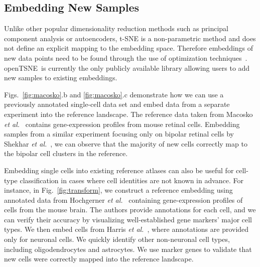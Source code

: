 \documentclass[twocolumn]{bmcart}
\newcommand{\opentsne}{\textsf{openTSNE}}
\begin{document}
\subsection*{Embedding New Samples}

Unlike other popular dimensionality reduction methods such as principal component analysis or autoencoders, t-SNE is a non-parametric method and does not define an explicit mapping to the embedding space. Therefore embeddings of new data points need to be found through the use of optimization techniques~\cite{policar2019embedding}. \opentsne\ is currently the only publicly available library allowing users to add new samples to existing embeddings.

Figs.~\ref{fig:macosko}.b and \ref{fig:macosko}.c demonstrate how we can use a previously annotated single-cell data set and embed data from a separate experiment into the reference landscape. The reference data taken from Macosko \textit{et al.}~\cite{macosko2015highly} contains gene-expression profiles from mouse retinal cells. Embedding samples from a similar experiment focusing only on bipolar retinal cells by Shekhar \textit{et al.}~\cite{shekhar2016comprehensive}, we can observe that the majority of new cells correctly map to the bipolar cell clusters in the reference.

Embedding single cells into existing reference atlases can also be useful for cell-type classification in cases where cell identities are not known in advance. For instance, in Fig.~\ref{fig:transform}, we construct a reference embedding using annotated data from Hochgerner \textit{et al.}~\cite{hochgerner2018conserved} containing gene-expression profiles of cells from the mouse brain. The authors provide annotations for each cell, and we can verify their accuracy by visualizing well-established gene markers' major cell types. We then embed cells from Harris \textit{et al.}~\cite{harris2018classes}, where annotations are provided only for neuronal cells. We quickly identify other non-neuronal cell types, including oligodendrocytes and astrocytes. We use marker genes to validate that new cells were correctly mapped into the reference landscape.
\end{document}
